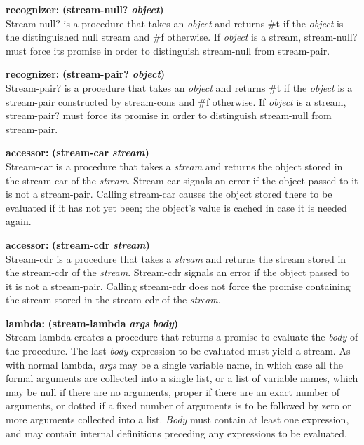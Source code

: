 \textbf{recognizer:} \textbf{(stream-null?} \textbf{\emph{object})}\\
Stream-null? is a procedure that takes an \emph{object} and returns \#t
if the \emph{object} is the distinguished null stream and \#f otherwise.
If \emph{object} is a stream, stream-null? must force its promise in
order to distinguish stream-null from stream-pair.

\textbf{recognizer:} \textbf{(stream-pair?} \textbf{\emph{object})}\\
Stream-pair? is a procedure that takes an \emph{object} and returns \#t
if the \emph{object} is a stream-pair constructed by stream-cons and \#f
otherwise. If \emph{object} is a stream, stream-pair? must force its
promise in order to distinguish stream-null from stream-pair.

\textbf{accessor:} \textbf{(stream-car} \textbf{\emph{stream})}\\
Stream-car is a procedure that takes a \emph{stream} and returns the
object stored in the stream-car of the \emph{stream}. Stream-car signals
an error if the object passed to it is not a stream-pair. Calling
stream-car causes the object stored there to be evaluated if it has not
yet been; the object's value is cached in case it is needed again.

\textbf{accessor:} \textbf{(stream-cdr} \textbf{\emph{stream})}\\
Stream-cdr is a procedure that takes a \emph{stream} and returns the
stream stored in the stream-cdr of the \emph{stream}. Stream-cdr signals
an error if the object passed to it is not a stream-pair. Calling
stream-cdr does not force the promise containing the stream stored in
the stream-cdr of the \emph{stream}.

\textbf{lambda:} \textbf{(stream-lambda} \textbf{\emph{args}} \textbf{}
\textbf{\emph{body})}\\
Stream-lambda creates a procedure that returns a promise to evaluate the
\emph{body} of the procedure. The last \emph{body} expression to be
evaluated must yield a stream. As with normal lambda, \emph{args} may be
a single variable name, in which case all the formal arguments are
collected into a single list, or a list of variable names, which may be
null if there are no arguments, proper if there are an exact number of
arguments, or dotted if a fixed number of arguments is to be followed by
zero or more arguments collected into a list. \emph{Body} must contain
at least one expression, and may contain internal definitions preceding
any expressions to be evaluated.

